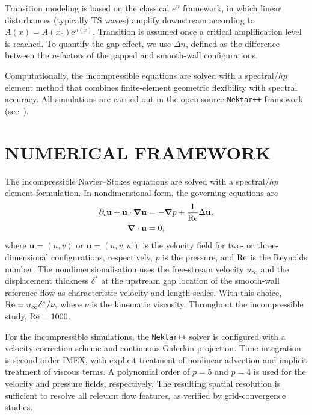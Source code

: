 \documentclass[twocolumn,10pt]{tsfp}
\newcommand\dstar{{\delta^*}} %
\begin{document}
Transition modeling is based on the classical $e^n$ framework, in which linear disturbances (typically TS waves) amplify downstream according to $A(x)=A(x_0)\mathrm{e}^{n(x)}$. Transition is assumed once a critical amplification level is reached. To quantify the gap effect, we use $\Delta n$, defined as the difference between the $n$-factors of the gapped and smooth-wall configurations.

Computationally, the incompressible equations are solved with a spectral/$hp$ element method that combines finite-element geometric flexibility with spectral accuracy. All simulations are carried out in the open-source \texttt{Nektar++} framework (see~\cite{nektar}).

\section*{NUMERICAL FRAMEWORK}
The incompressible Navier--Stokes equations are solved with a spectral/$hp$ element formulation. In nondimensional form, the governing equations are
\begin{equation}
	\begin{aligned}
		\partial_t \mathbf{u} + \mathbf{u} \cdot \grad \mathbf{u} & = -\grad p + \frac{1}{\mathrm{Re}} \Delta \mathbf{u}, \\
		\grad \cdot \mathbf{u}                                    & = 0,
	\end{aligned}
\end{equation}
where $\mathbf{u}=(u,v)$ or $\mathbf{u}=(u,v,w)$ is the velocity field for two- or three-dimensional configurations, respectively, $p$ is the pressure, and $\mathrm{Re}$ is the Reynolds number. The nondimensionalisation uses the free-stream velocity $u_\infty$ and the displacement thickness $\dstar$ at the upstream gap location of the smooth-wall reference flow as characteristic velocity and length scales. With this choice,
\(
\Rey=u_\infty \dstar/\nu,
\)
where $\nu$ is the kinematic viscosity. Throughout the incompressible study, $\mathrm{Re}=1000$.

For the incompressible simulations, the \texttt{Nektar++} solver is configured with a velocity-correction scheme and continuous Galerkin projection. Time integration is second-order IMEX, with explicit treatment of nonlinear advection and implicit treatment of viscous terms. A polynomial order of $p=5$ and $p=4$ is used for the velocity and pressure fields, respectively. The resulting spatial resolution is sufficient to resolve all relevant flow features, as verified by grid-convergence studies.
\end{document}
